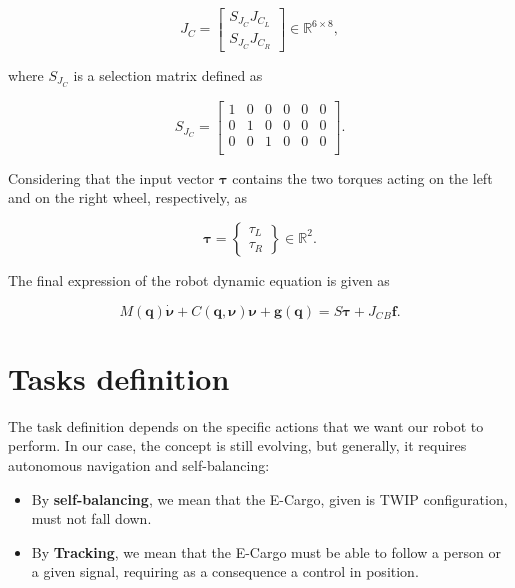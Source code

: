 \begin{equation}
    J_{C} = \begin{bmatrix}
    S_{J_{C}}J_{C_{L}} \\
    S_{J_{C}}J_{C_{R}}
\end{bmatrix} \in \mathbb{R}^{6 \times 8},
\label{eq:overall contact Jacobian}
\end{equation}

where $S_{J_{C}}$ is a selection matrix defined as

\begin{equation}
    S_{J_{C}} = \begin{bmatrix}
        1 & 0 & 0 & 0 & 0 & 0 \\
        0 & 1 & 0 & 0 & 0 & 0 \\
        0 & 0 & 1 & 0 & 0 & 0 \\
    \end{bmatrix}.
\end{equation}

Considering that the input vector $\bm{\tau}$ contains the two torques acting on the left and on the right wheel, respectively, as

\begin{equation}
    \bm{\tau} = \begin{Bmatrix}
    \tau_{L} \\
    \tau_{R}    
\end{Bmatrix} \in \mathbb{R}^{2}.
\end{equation}

The final expression of the robot dynamic equation is given as

\begin{equation}
      M(\mathbf{q})\dot{\bm{\nu}} + C(\mathbf{q},\bm{\nu})\bm{\nu} + \mathbf{g}(\mathbf{q}) = S\bm{\tau} + J_{C} {}_{B}\mathbf{f}.
      \label{eq:e-Cargo dynamic equation}
\end{equation}

\section{Tasks definition}
\label{sec:Tasks definition}

The task definition depends on the specific actions that we want our robot to perform.
In our case, the concept is still evolving, but generally, it requires autonomous navigation and self-balancing:

\begin{itemize}
    \item By \textbf{self-balancing}, we mean that the E-Cargo, given is TWIP configuration, must not fall down.
    \item By \textbf{Tracking}, we mean that the E-Cargo must be able to follow a person or a given signal, requiring as a consequence a control in position.
\end{itemize}

